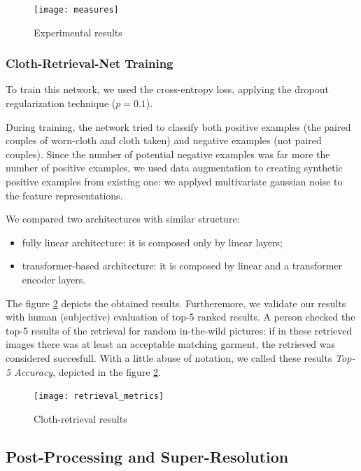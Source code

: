 \begin{figure}[h]
\centering
\texttt{[image: measures]}
\caption{Experimental results}
\label{fig:Measures}
\end{figure}


\subsubsection{Cloth-Retrieval-Net Training}
\label{retrieval-training}

To train this network, we used the cross-entropy loss, applying the dropout regularization technique ($p=0.1$).

During training, the network tried to classify both positive examples (the paired couples of worn-cloth and cloth taken) and negative examples (not paired couples). Since the number of potential negative examples was far more the number of positive examples, we used data augmentation to creating synthetic positive examples from existing one: we applyed multivariate gaussian noise to the feature representations.

We compared two architectures with similar structure:
\begin{itemize}[noitemsep]
	\item{fully linear architecture: it is composed only by linear layers;}
	\item{transformer-based architecture: it is composed by linear and a transformer encoder layers.}
\end{itemize}
The figure \ref{fig:cloth-retrieval-results} depicts the obtained results. Furtheremore, we validate our results with human (subjective) evaluation of top-5 ranked results. A person checked the top-5 results of the retrieval for random in-the-wild pictures: if in these retrieved images there was at least an acceptable matching garment, the retrieved was considered succesfull. With a little abuse of notation, we called these results \textit{Top-5 Accuracy}, depicted in the figure \ref{fig:cloth-retrieval-results}.

\begin{figure}[h]
\centering
\texttt{[image: retrieval\_metrics]}
\caption{Cloth-retrieval results}
\label{fig:cloth-retrieval-results}
\end{figure}



\subsection{Post-Processing and Super-Resolution}

